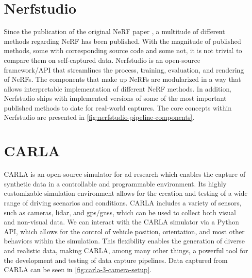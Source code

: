 \section{Nerfstudio} \label{sec:nerfstudio}

Since the publication of the original NeRF paper \cite{mildenhall_nerf_2020}, a multitude of different methods regarding NeRF has been published. With the magnitude of published methods, some with corresponding source code and some not, it is not trivial to compare them on self-captured data. Nerfstudio \cite{nerfstudio} is an open-source framework/API that streamlines the process, training, evaluation, and rendering of NeRFs. The components that make up NeRFs are modularized in a way that allows interpretable implementation of different NeRF methods. In addition, Nerfstudio ships with implemented versions of some of the most important published methods to date for real-world captures. The core concepts within Nerfstudio are presented in \autoref{fig:nerfstudio-pipeline-components}. 






\section{CARLA} \label{sec:carla}
CARLA \cite{Dosovitskiy17} is an open-source simulator for \acrshort{ad} research which enables the capture of synthetic data in a controllable and programmable environment. Its highly customizable simulation environment allows for the creation and testing of a wide range of driving scenarios and conditions. CARLA includes a variety of sensors, such as cameras, \acrfull{lidar}, and \acrfull{gps}/\acrfull{gnss}, which can be used to collect both visual and non-visual data. We can interact with the CARLA simulator via a Python API, which allows for the control of vehicle position, orientation, and most other behaviors within the simulation. This flexibility enables the generation of diverse and realistic data, making CARLA, among many other things, a powerful tool for the development and testing of data capture pipelines. Data captured from CARLA can be seen in \autoref{fig:carla-3-camera-setup}.

